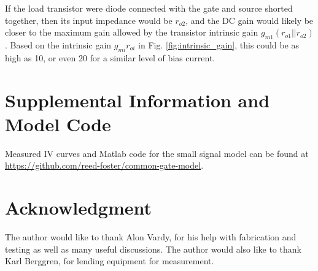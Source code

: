 \documentclass[conference]{IEEEtran}
\begin{document}
If the load transistor were diode connected with the gate and source shorted together, then its input impedance would be $r_{o2}$, and the DC gain would likely be closer to the maximum gain allowed by the transistor intrinsic gain $g_{m1}(r_{o1}||r_{o2})$.
Based on the intrinsic gain $g_{mi}r_{oi}$ in Fig. \ref{fig:intrinsic_gain}, this could be as high as 10, or even 20 for a similar level of bias current.

\section{Supplemental Information and Model Code}

Measured IV curves and Matlab code for the small signal model can be found at \url{https://github.com/reed-foster/common-gate-model}.

\section*{Acknowledgment}

The author would like to thank Alon Vardy, for his help with fabrication and testing as well as many useful discussions. The author would also like to thank Karl Berggren, for lending equipment for measurement.
\end{document}
